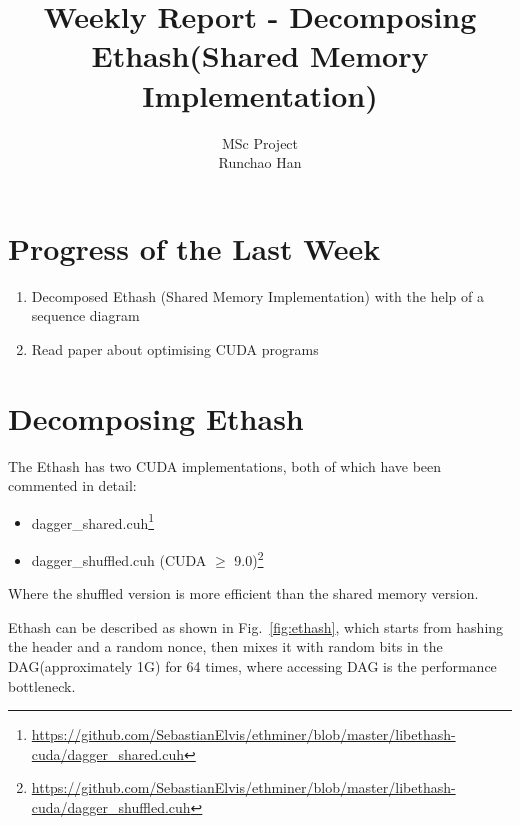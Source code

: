 \documentclass[11pt]{article}
\begin{document}
\title{Weekly Report - Decomposing Ethash(Shared Memory Implementation)}
\author{MSc Project \\
Runchao Han \\
}
\maketitle


\section{Progress of the Last Week}

\begin{enumerate}
\item Decomposed Ethash (Shared Memory Implementation) with the help of a sequence diagram
\item Read paper about optimising CUDA programs
\end{enumerate}

\section{Decomposing Ethash}

The Ethash has two CUDA implementations, both of which have been commented in detail:

\begin{itemize}
\item dagger\_shared.cuh\footnote{\url{https://github.com/SebastianElvis/ethminer/blob/master/libethash-cuda/dagger_shared.cuh}}
\item dagger\_shuffled.cuh (CUDA $\geq$ 9.0)\footnote{\url{https://github.com/SebastianElvis/ethminer/blob/master/libethash-cuda/dagger_shuffled.cuh}}
\end{itemize}

Where the shuffled version is more efficient than the shared memory version.

Ethash can be described as shown in Fig.~\ref{fig:ethash}, which starts from hashing the header and a random nonce, then mixes it with random bits in the DAG(approximately 1G) for 64 times, where accessing DAG is the performance bottleneck.
\end{document}
